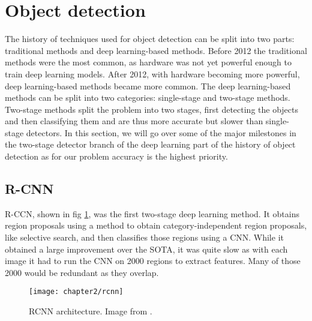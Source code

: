

\section{Object detection}
The history of techniques used for object detection can be split into two parts: traditional methods and deep learning-based methods. Before 2012 the traditional methods were the most common, as hardware was not yet powerful enough to train deep learning models. After 2012, with hardware becoming more powerful, deep learning-based methods became more common. The deep learning-based methods can be split into two categories: single-stage and two-stage methods. Two-stage methods split the problem into two stages, first detecting the objects and then classifying them and are thus more accurate but slower than single-stage detectors. In this section, we will go over some of the major milestones in the two-stage detector branch of the deep learning part of the history of object detection as for our problem accuracy is the highest priority.

\subsection{R-CNN \cite{rcnn}}
R-CCN, shown in fig \ref{fig:2_rcnn}, was the first two-stage deep learning method. It obtains region proposals using a method to obtain category-independent region proposals, like selective search\cite{selectivesearch}, and then classifies those regions using a CNN. While it obtained a large improvement over the SOTA, it was quite slow as with each image it had to run the CNN on 2000 regions to extract features. Many of those 2000 would be redundant as they overlap.

\begin{figure}[H]
	\centering
	\texttt{[image: chapter2/rcnn]}
	\caption{\label{fig:2_rcnn} RCNN architecture. Image from \citet{rcnn}.}
\end{figure}

